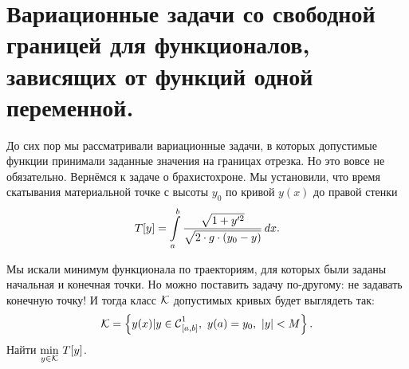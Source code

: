 \section[Задачи со свободными концами.]{Вариационные задачи со свободной границей для функционалов, зависящих от функций одной переменной.}
\label{lecture3section2}
До сих пор мы рассматривали вариационные задачи, в которых допустимые функции принимали заданные значения на границах отрезка. Но это вовсе не обязательно. Вернёмся к задаче о брахистохроне. Мы установили, что время скатывания материальной точке с высоты $y_0$ по кривой $y(x)$ до правой стенки 
\begin{equation*}
	\hfill T[y]=\int\limits_a^b\frac{\sqrt{1+y^{\prime2}}}{\sqrt{2\cdot g\cdot(y_0-y)}}\,dx.\hfill
\end{equation*}



Мы искали минимум функционала по траекториям, для которых были заданы начальная и конечная точки. Но можно поставить задачу по-другому: не задавать конечную точку! И тогда класс $\mathcal{K}$ допустимых кривых будет выглядеть так:
\begin{equation*}
	\hfill\K=\left\{y(x)|y\in\Cfn[{[a,b]}]{1},\ y(a)=y_0,\ |y|<M\right\}.\hfill
\end{equation*}
Найти $\displaystyle\min\limits_{y\in\mathcal{K}}\,T[y]$.

